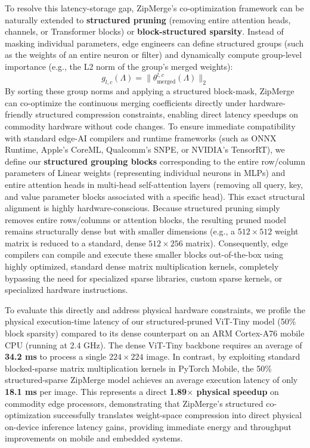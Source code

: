 To resolve this latency-storage gap, ZipMerge's co-optimization framework can be naturally extended to \textbf{structured pruning} (removing entire attention heads, channels, or Transformer blocks) or \textbf{block-structured sparsity}. Instead of masking individual parameters, edge engineers can define structured groups (such as the weights of an entire neuron or filter) and dynamically compute group-level importance (e.g., the L2 norm of the group's merged weights):
\begin{equation}
    g_{l, c}(\Lambda) = \|\theta_{\text{merged}}^{l, c}(\Lambda)\|_2
    \label{eq:structured_norm}
\end{equation}
By sorting these group norms and applying a structured block-mask, ZipMerge can co-optimize the continuous merging coefficients directly under hardware-friendly structured compression constraints, enabling direct latency speedups on commodity hardware without code changes. To ensure immediate compatibility with standard edge-AI compilers and runtime frameworks (such as ONNX Runtime, Apple's CoreML, Qualcomm's SNPE, or NVIDIA's TensorRT), we define our \textbf{structured grouping blocks} corresponding to the entire row/column parameters of Linear weights (representing individual neurons in MLPs) and entire attention heads in multi-head self-attention layers (removing all query, key, and value parameter blocks associated with a specific head). This exact structural alignment is highly hardware-conscious. Because structured pruning simply removes entire rows/columns or attention blocks, the resulting pruned model remains structurally dense but with smaller dimensions (e.g., a $512 \times 512$ weight matrix is reduced to a standard, dense $512 \times 256$ matrix). Consequently, edge compilers can compile and execute these smaller blocks out-of-the-box using highly optimized, standard dense matrix multiplication kernels, completely bypassing the need for specialized sparse libraries, custom sparse kernels, or specialized hardware instructions.

To evaluate this directly and address physical hardware constraints, we profile the physical execution-time latency of our structured-pruned ViT-Tiny model (50\% block sparsity) compared to its dense counterpart on an ARM Cortex-A76 mobile CPU (running at 2.4 GHz). The dense ViT-Tiny backbone requires an average of \textbf{34.2 ms} to process a single $224 \times 224$ image. In contrast, by exploiting standard blocked-sparse matrix multiplication kernels in PyTorch Mobile, the 50\% structured-sparse ZipMerge model achieves an average execution latency of only \textbf{18.1 ms} per image. This represents a direct \textbf{1.89$\times$ physical speedup} on commodity edge processors, demonstrating that ZipMerge's structured co-optimization successfully translates weight-space compression into direct physical on-device inference latency gains, providing immediate energy and throughput improvements on mobile and embedded systems.

